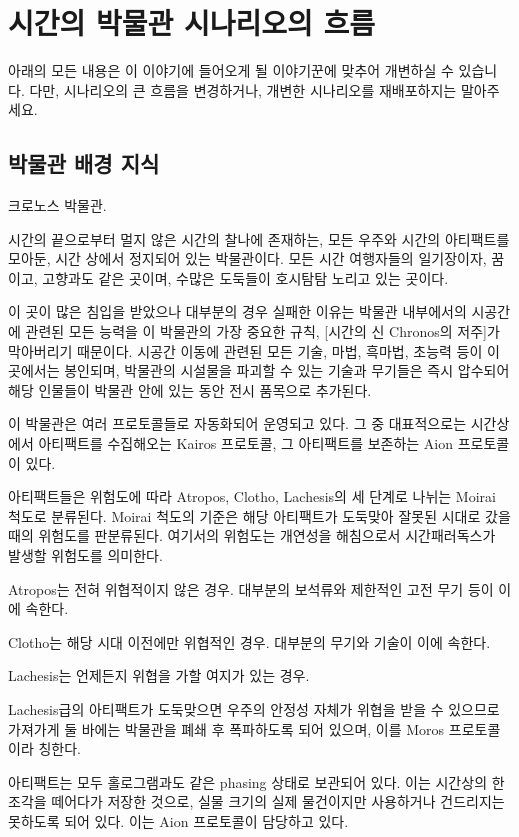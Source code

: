 \documentclass[12pt]{report}
\newcommand{\world}[1]{{\nanumpen \large #1 \par}\bigskip}
\begin{document}
	\tableofcontents
	
	\chapter{시간의 박물관 시나리오의 흐름}
	아래의 모든 내용은 이 이야기에 들어오게 될 이야기꾼에 맞추어 개변하실 수 있습니다. 다만, 시나리오의 큰 흐름을 변경하거나, 개변한 시나리오를 재배포하지는 말아주세요.
	
	\section*{박물관 배경 지식}
	\world{
	크로노스 박물관.
	
	시간의 끝으로부터 멀지 않은 시간의 찰나에 존재하는, 모든 우주와 시간의 아티팩트를 모아둔, 시간 상에서 정지되어 있는 박물관이다. 모든 시간 여행자들의 일기장이자, 꿈이고, 고향과도 같은 곳이며, 수많은 도둑들이 호시탐탐 노리고 있는 곳이다.
	
	이 곳이 많은 침입을 받았으나 대부분의 경우 실패한 이유는 박물관 내부에서의 시공간에 관련된 모든 능력을 이 박물관의 가장 중요한 규칙, [시간의 신 Chronos의 저주]가 막아버리기 때문이다. 시공간 이동에 관련된 모든 기술, 마법, 흑마법, 초능력 등이 이곳에서는 봉인되며, 박물관의 시설물을 파괴할 수 있는 기술과 무기들은 즉시 압수되어 해당 인물들이 박물관 안에 있는 동안 전시 품목으로 추가된다.
	
	이 박물관은 여러 프로토콜들로 자동화되어 운영되고 있다. 그 중 대표적으로는 시간상에서 아티팩트를 수집해오는 Kairos 프로토콜, 그 아티팩트를 보존하는 Aion 프로토콜이 있다.
	
	아티팩트들은 위험도에 따라 Atropos, Clotho, Lachesis의 세 단계로 나뉘는 Moirai 척도로 분류된다. Moirai 척도의 기준은 해당 아티팩트가 도둑맞아 잘못된 시대로 갔을 때의 위험도를 판분류된다. 여기서의 위험도는 개연성을 해침으로서 시간패러독스가 발생할 위험도를 의미한다.
	
	Atropos는 전혀 위협적이지 않은 경우. 대부분의 보석류와 제한적인 고전 무기 등이 이에 속한다.
	
	Clotho는 해당 시대 이전에만 위협적인 경우. 대부분의 무기와 기술이 이에 속한다.
	
	Lachesis는 언제든지 위협을 가할 여지가 있는 경우.
	
	Lachesis급의 아티팩트가 도둑맞으면 우주의 안정성 자체가 위협을 받을 수 있으므로 가져가게 둘 바에는 박물관을 폐쇄 후 폭파하도록 되어 있으며, 이를 Moros 프로토콜이라 칭한다.
	
	아티팩트는 모두 홀로그램과도 같은 phasing 상태로 보관되어 있다. 이는 시간상의 한 조각을 떼어다가 저장한 것으로, 실물 크기의 실제 물건이지만 사용하거나 건드리지는 못하도록 되어 있다. 이는 Aion 프로토콜이 담당하고 있다.
	}
	
\end{document}
